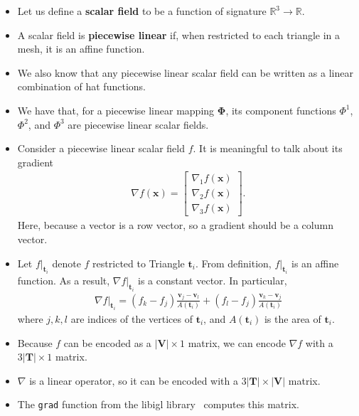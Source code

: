 \documentclass[10pt]{article}
\newcommand{\ve}[1]{\mathbf{#1}}
\newcommand{\ves}[1]{\boldsymbol{#1}}
\newcommand{\ra}{\rightarrow}
\newcommand{\Real}{\mathbb{R}}
\begin{document}
\begin{itemize}
    \item Let us define a {\bf scalar field} to be a function of signature $\Real^3 \ra \Real$.
    \item A scalar field is {\bf piecewise linear} if, when restricted to each triangle in a mesh, it is an affine function.
    \item We also know that any piecewise linear scalar field can be written as a linear combination of hat functions.
    \item We have that, for a piecewise linear mapping $\ves{\Phi}$, its component functions $\Phi^1$, $\Phi^2$, and $\Phi^3$ are piecewise linear scalar fields.
    \item Consider a piecewise linear scalar field $f$. It is meaningful to talk about its gradient
    \begin{align*}
        \nabla f(\ve{x}) = \begin{bmatrix}
            \nabla_1 f(\ve{x}) \\
            \nabla_2 f(\ve{x}) \\
            \nabla_3 f(\ve{x})
        \end{bmatrix}.        
    \end{align*}
    Here, because a vector is a row vector, so a gradient should be a column vector.

    \item Let $f|_{\ve{t}_i}$ denote $f$ restricted to Triangle $\ve{t}_i$. From definition, $f|_{\ve{t}_i}$ is an affine function. As a result, $\nabla f|_{\ve{t}_i}$ is a constant vector. In particular,
    \begin{align*}
        \nabla f|_{\ve{t}_i} = (f_k - f_j) \frac{\ve{v}_j - \ve{v}_l}{A(\ve{t}_i)} + (f_l - f_j) \frac{\ve{v}_k - \ve{v}_j}{A(\ve{t}_i)}
    \end{align*}
    where $j,k,l$ are indices of the vertices of $\ve{t}_i$, and $A(\ve{t}_i)$ is the area of $\ve{t}_i$.

    \item Because $f$ can be encoded as a $|\ve{V}| \times 1$ matrix, we can encode $\nabla f$ with a $3|\ve{T}| \times 1$ matrix.
    
    \item $\nabla$ is a linear operator, so it can be encoded with a $3|\ve{T}| \times |\ve{V}|$ matrix.
    
    \item The \texttt{grad} function from the libigl library~\cite{libigl:2025} computes this matrix.
\end{itemize}
\end{document}
